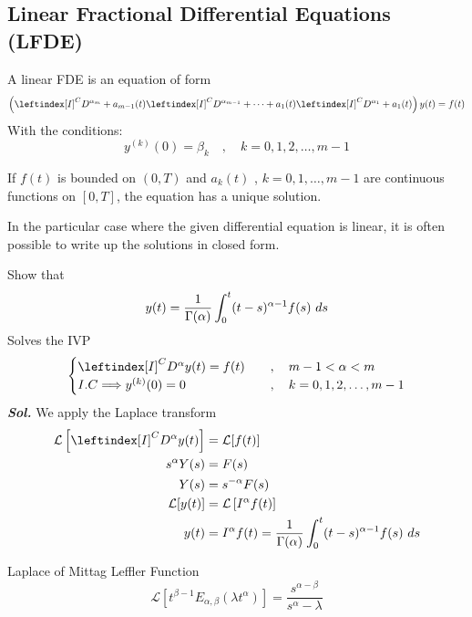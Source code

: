 \newpage
\subsection{Linear Fractional Differential Equations (LFDE)}
A linear FDE is an equation of form
\[
    \left(\leftindex[I]^C {D^{\alpha_m}} + a_{m-1}(t)\leftindex[I]^C {D^{\alpha_{m-1}}} + \dots + a_{1}(t)\leftindex[I]^C {D^{\alpha_{1}}} + a_{1}(t) \right) y(t) = f(t)
\]
With the conditions:
\[
    y^{(k)}(0) = \beta_k \quad,\quad k = 0,1,2,\dots,m-1
\]
\begin{theorem}
    If $f(t)$ is bounded on $(0, T)$ and $a_{k}(t)$ , $k = {0, 1, \dots , m-1}$ 
    are continuous functions on $[0, T]$, the equation has a unique solution.
\end{theorem}
In the particular case where the given differential equation is linear, it is often possible
to write up the solutions in closed form.
\begin{example}
    Show that 
    \[
        y(t) = \frac{1}{\Gamma(\alpha)}\int_{0}^{t} (t-s)^{\alpha-1}f(s) \,\, ds
    \]
    Solves the IVP 
    \[
        \begin{cases}
            \leftindex[I]^C {D^{\alpha}} y(t) = f(t)    \quad&,\quad m-1<\alpha<m
            \\
            I.C \Longrightarrow y^{(k)}(0) = 0 \quad&,\quad k = 0,1,2,\dots,m-1
        \end{cases}
    \]
    \textit{ \textbf{Sol.} } We apply the Laplace transform
        \begin{align*}
            \mathcal{L}\left[\leftindex[I]^C {D^{\alpha}} y(t)\right] &= \mathcal{L}[f(t)]
            \\
            s^{\alpha} Y(s) &= F(s)
            \\
            Y(s) &= s^{-\alpha}F(s)
            \\
            \mathcal{L}[y(t)] &= \mathcal{L}\left[I^{\alpha}f(t)\right]
            \\
            y(t) &= I^{\alpha}f(t) = \frac{1}{\Gamma(\alpha)}\int_{0}^{t} (t-s)^{\alpha-1}f(s) \hquad ds
        \end{align*}
\end{example}
\begin{enrichment*}{Laplace of Mittag Leffler Function }
    \[
        \mathcal{L}\left[t^{\beta-1} E_{\alpha,\beta}(\lambda t^\alpha)\right] = \frac{s^{\alpha - \beta}}{s^{\alpha}-\lambda}
    \]
\end{enrichment*}
